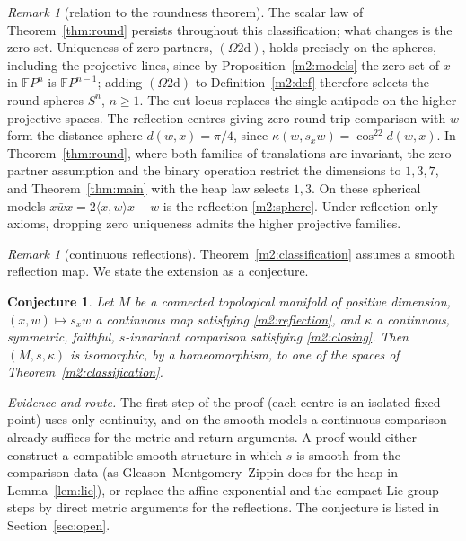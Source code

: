 \documentclass[11pt,reqno]{amsart}
\newtheorem{conjecture}[theorem]{Conjecture}
\theoremstyle{definition}
\theoremstyle{remark}
\newtheorem{remark}[theorem]{Remark}
\numberwithin{equation}{section}
\newcommand{\ip}[2]{\langle #1,#2\rangle}
\begin{document}
\begin{remark}[relation to the roundness theorem]\label{m2:roundness}
The scalar law of Theorem~\ref{thm:round} persists throughout this classification; what changes is the zero set.  Uniqueness of zero
partners, $(\Omega2\mathrm d)$, holds precisely on the spheres, including the projective lines, since by Proposition~\ref{m2:models} the zero set
of $x$ in $\mathbb FP^n$ is $\mathbb FP^{n-1}$; adding $(\Omega2\mathrm d)$ to Definition~\ref{m2:def} therefore selects the round spheres
$S^n$, $n\ge1$.  The cut locus replaces the single antipode on the higher projective spaces.  The reflection centres giving zero
round-trip comparison with $w$ form the distance sphere $d(w,x)=\pi/4$, since $\kappa(w,s_xw)=\cos^22d(w,x)$.  In Theorem~\ref{thm:round},
where both families of translations are invariant, the zero-partner assumption and the binary operation restrict the dimensions to
$1,3,7$, and Theorem~\ref{thm:main} with the heap law selects $1,3$.  On these spherical models $x\bar wx=2\ip xwx-w$ is the reflection
\eqref{m2:sphere}.  Under reflection-only axioms, dropping zero uniqueness admits the higher projective families.
\end{remark}

\begin{remark}[continuous reflections]\label{m2:programme}
Theorem~\ref{m2:classification} assumes a smooth reflection map.  We state the extension as a conjecture.
\end{remark}

\begin{conjecture}\label{m2:conjecture}
Let $M$ be a connected topological manifold of positive dimension, $(x,w)\mapsto s_xw$ a continuous map satisfying \eqref{m2:reflection},
and $\kappa$ a continuous, symmetric, faithful, $s$-invariant comparison satisfying \eqref{m2:closing}.  Then $(M,s,\kappa)$ is isomorphic,
by a homeomorphism, to one of the spaces of Theorem~\ref{m2:classification}.
\end{conjecture}

\noindent\emph{Evidence and route.}  The first step of the proof (each centre is an isolated fixed point) uses only continuity, and on the
smooth models a continuous comparison already suffices for the metric and return arguments.  A proof would either construct a compatible
smooth structure in which $s$ is smooth from the comparison data (as Gleason--Montgomery--Zippin does for the heap in
Lemma~\ref{lem:lie}), or replace the affine exponential and the compact Lie group steps by direct metric arguments for the reflections.
The conjecture is listed in Section~\ref{sec:open}.
\end{document}
